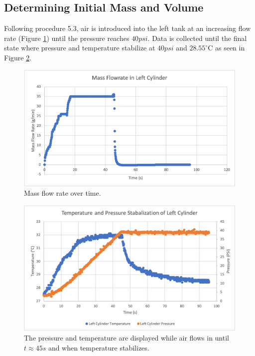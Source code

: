 \documentclass[titlepage, twocolumn, 12pt]{article}
\begin{document}
\subsection{Determining Initial Mass and Volume}

Following procedure 5.3, air is introduced into the left tank at an increasing flow rate (Figure \ref{fig:flow}) until the pressure reaches $40psi$. Data is collected until the final state where pressure and temperature stabilize at $40psi$ and $28.55^{\circ}$C as seen in Figure \ref{fig:initial-mass}.

\begin{figure}[h]
    \centering
    \includegraphics[scale=0.4]{images/mass-flow-rate.png}
    \caption{Mass flow rate over time.}
    \label{fig:flow}
\end{figure}

\begin{figure}[h]
    \centering
    \includegraphics[scale=0.4]{images/2a-start.png}
    \caption{The pressure and temperature are displayed while air flows in until $t\approx45s$ and when temperature stabilizes.}
    \label{fig:initial-mass}
\end{figure}
\end{document}

